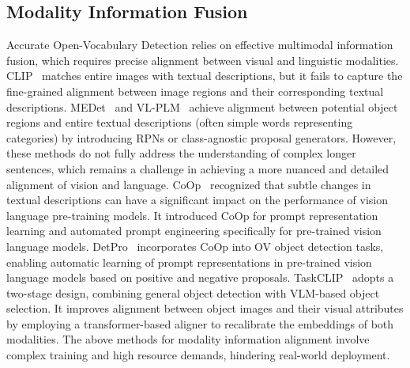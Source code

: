 \subsection{Modality Information Fusion}
Accurate Open-Vocabulary Detection relies on effective multimodal information fusion, which requires precise alignment between visual and linguistic modalities. CLIP~\cite{pmlr-v139-radford21a} matches entire images with textual descriptions, but it fails to capture the fine-grained alignment between image regions and their corresponding textual descriptions. MEDet~\cite{chen2022open} and VL-PLM~\cite{zhao2022exploiting} achieve alignment between potential object regions and entire textual descriptions (often simple words representing categories) by introducing RPNs or class-agnostic proposal generators. However, these methods do not fully address the understanding of complex longer sentences, which remains a challenge in achieving a more nuanced and detailed alignment of vision and language. CoOp~\cite{zhou2022learning} recognized that subtle changes in textual descriptions can have a significant impact on the performance of vision language pre-training models. It introduced CoOp for prompt representation learning and automated prompt engineering specifically for pre-trained vision language models. DetPro~\cite{du2022learning} incorporates CoOp into OV object detection tasks, enabling automatic learning of prompt representations in pre-trained vision language models based on positive and negative proposals. TaskCLIP~\cite{chen2024taskclip} adopts a two-stage design, combining general object detection with VLM-based object selection. It improves alignment between object images and their visual attributes by employing a transformer-based aligner to recalibrate the embeddings of both modalities. The above methods for modality information alignment involve complex training and high resource demands, hindering real-world deployment.
